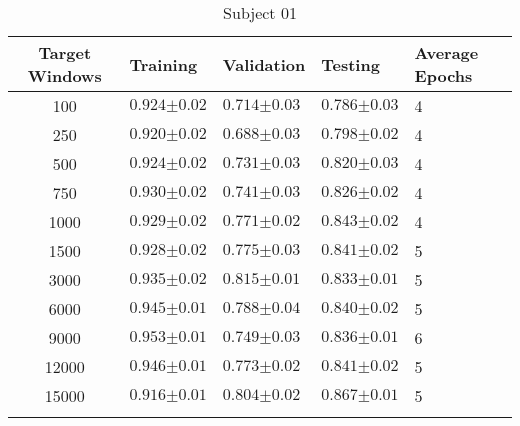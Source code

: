 \begin{table}[H]
    \centering
    \caption[Classification accuracy for a 32 unit  model with the  layer retrained with increasing amount of target data]{Classification accuracy for a 32 unit \acrshort{lstm} model with the dense layer retrained  with increasing amount of target data. The table shows the classification accuracy for the target user training, validation and test data sets $\pm\sigma (n=25)$. A value of one represents 100\% correct classification.}
    \label{tab:classifcation_performance_frozen-dense-layer}
    \begin{subtable}{\textwidth}
    \caption{Subject 01}
    \begin{tabularx}{\textwidth}{cYYYY}
        Target Windows & Training & Validation & Testing & Average Epochs \\
         & $0.924{\scriptscriptstyle\pm0.02}$ & $0.714{\scriptscriptstyle\pm0.03}$ & $0.786{\scriptscriptstyle\pm0.03}$ & 4 \\
250 & $0.920{\scriptscriptstyle\pm0.02}$ & $0.688{\scriptscriptstyle\pm0.03}$ & $0.798{\scriptscriptstyle\pm0.02}$ & 4 \\
500 & $0.924{\scriptscriptstyle\pm0.02}$ & $0.731{\scriptscriptstyle\pm0.03}$ & $0.820{\scriptscriptstyle\pm0.03}$ & 4 \\
750 & $0.930{\scriptscriptstyle\pm0.02}$ & $0.741{\scriptscriptstyle\pm0.03}$ & $0.826{\scriptscriptstyle\pm0.02}$ & 4 \\
1000 & $0.929{\scriptscriptstyle\pm0.02}$ & $0.771{\scriptscriptstyle\pm0.02}$ & $0.843{\scriptscriptstyle\pm0.02}$ & 4 \\
1500 & $0.928{\scriptscriptstyle\pm0.02}$ & $0.775{\scriptscriptstyle\pm0.03}$ & $0.841{\scriptscriptstyle\pm0.02}$ & 5 \\
3000 & $0.935{\scriptscriptstyle\pm0.02}$ & $0.815{\scriptscriptstyle\pm0.01}$ & $0.833{\scriptscriptstyle\pm0.01}$ & 5 \\
6000 & $0.945{\scriptscriptstyle\pm0.01}$ & $0.788{\scriptscriptstyle\pm0.04}$ & $0.840{\scriptscriptstyle\pm0.02}$ & 5 \\
9000 & $0.953{\scriptscriptstyle\pm0.01}$ & $0.749{\scriptscriptstyle\pm0.03}$ & $0.836{\scriptscriptstyle\pm0.01}$ & 6 \\
12000 & $0.946{\scriptscriptstyle\pm0.01}$ & $0.773{\scriptscriptstyle\pm0.02}$ & $0.841{\scriptscriptstyle\pm0.02}$ & 5 \\
15000 & $0.916{\scriptscriptstyle\pm0.01}$ & $0.804{\scriptscriptstyle\pm0.02}$ & $0.867{\scriptscriptstyle\pm0.01}$ & 5 \\
          \\
    \end{tabularx}
    \end{subtable}
\end{table}
